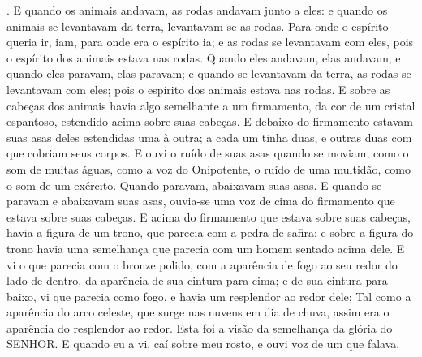 {{} .
  E quando os animais andavam, as rodas andavam junto a eles: e quando os animais se levantavam da terra, levantavam-se
{} as rodas.
  Para onde o espírito queria ir, iam, para onde era o espírito ia; e as rodas
{} se levantavam com eles, pois o espírito dos animais estava nas rodas.
  Quando eles andavam, elas andavam; e quando eles paravam, elas paravam; e quando se levantavam da terra, as rodas se levantavam com eles; pois o espírito dos animais estava nas rodas.
  E sobre as cabeças dos animais havia algo semelhante a um firmamento,
 da cor de um cristal espantoso, estendido acima sobre suas cabeças.
  E debaixo do firmamento estavam suas asas deles estendidas uma à outra; a cada um tinha duas, e outras duas com que cobriam seus corpos.
  E ouvi o ruído de suas asas quando se moviam, como o som de muitas águas, como a voz do Onipotente, o ruído de uma multidão, como o som de um exército. Quando paravam, abaixavam suas asas.
  E quando se paravam e abaixavam suas asas, ouvia-se uma voz de cima do firmamento que estava sobre suas cabeças.
  E acima do firmamento que estava sobre suas cabeças, havia a figura de um trono, que parecia com a pedra de safira; e sobre a figura do trono havia uma semelhança que parecia com um homem sentado acima dele.
  E vi o que parecia com o bronze polido, com a aparência de fogo ao seu redor do lado de dentro, da aparência de sua cintura
 para cima; e de sua cintura para baixo, vi que parecia como fogo, e havia um resplendor ao redor dele;
  Tal como a aparência do arco celeste, que surge nas nuvens em dia de chuva, assim era o aparência do resplendor ao redor. Esta foi a visão da semelhança da glória do SENHOR. E quando eu a vi, caí sobre meu rosto, e ouvi voz de um que falava.
\par }

